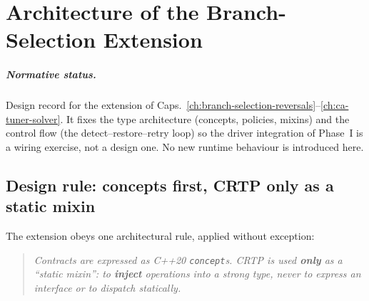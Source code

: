 
\chapter{Architecture of the Branch-Selection Extension}
\label{ch:extension-architecture}

\paragraph{Normative status.}
Design record for the extension of
Caps.~\ref{ch:branch-selection-reversals}--\ref{ch:ca-tuner-solver}. It
fixes the type architecture (concepts, policies, mixins) and the control
flow (the detect--restore--retry loop) so the driver integration of
Phase~I is a wiring exercise, not a design one. No new runtime behaviour
is introduced here.

\section{Design rule: concepts first, CRTP only as a static mixin}
\label{sec:ext-design-rule}

The extension obeys one architectural rule, applied without exception:

\begin{quote}
\emph{Contracts are expressed as C++20 \texttt{concept}s. CRTP is used
\textbf{only} as a ``static mixin'': to \textbf{inject} operations into a
strong type, never to express an interface or to dispatch statically.}
\end{quote}

